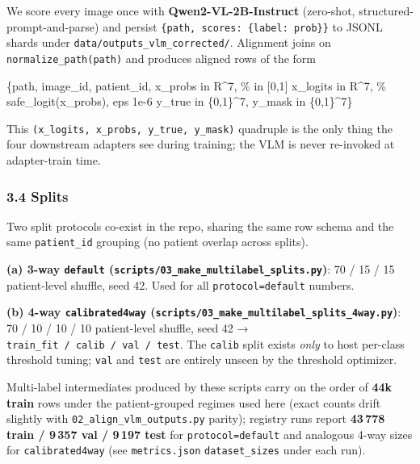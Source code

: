 \documentclass[
  11pt,
]{article}
\newenvironment{Shaded}{}{}
\newcommand{\NormalTok}[1]{#1}
\begin{document}
We score every image once with \textbf{Qwen2-VL-2B-Instruct} (zero-shot,
structured-prompt-and-parse) and persist
\texttt{\{path,\ scores:\ \{label:\ prob\}\}} to JSONL shards under
\texttt{data/outputs\_vlm\_corrected/}. Alignment joins on
\texttt{normalize\_path(path)} and produces aligned rows of the form

\begin{Shaded}
\begin{Highlighting}[]
\NormalTok{\{path, image\_id, patient\_id,}
\NormalTok{ x\_probs   in R\^{}7,    \% in [0,1]}
\NormalTok{ x\_logits  in R\^{}7,    \% safe\_logit(x\_probs), eps 1e{-}6}
\NormalTok{ y\_true    in \{0,1\}\^{}7,}
\NormalTok{ y\_mask    in \{0,1\}\^{}7\}}
\end{Highlighting}
\end{Shaded}

This \texttt{(x\_logits,\ x\_probs,\ y\_true,\ y\_mask)} quadruple is
the only thing the four downstream adapters see during training; the VLM
is never re-invoked at adapter-train time.

\subsubsection{3.4 Splits}\label{splits}

Two split protocols co-exist in the repo, sharing the same row schema
and the same \texttt{patient\_id} grouping (no patient overlap across
splits).

\textbf{(a) 3-way \texttt{default}
(\texttt{scripts/03\_make\_multilabel\_splits.py})}: 70 / 15 / 15
patient-level shuffle, seed 42. Used for all \texttt{protocol=default}
numbers.

\textbf{(b) 4-way \texttt{calibrated4way}
(\texttt{scripts/03\_make\_multilabel\_splits\_4way.py})}: 70 / 10 / 10
/ 10 patient-level shuffle, seed 42 →
\texttt{train\_fit\ /\ calib\ /\ val\ /\ test}. The \texttt{calib} split
exists \emph{only} to host per-class threshold tuning; \texttt{val} and
\texttt{test} are entirely unseen by the threshold optimizer.

Multi-label intermediates produced by these scripts carry on the order
of \textbf{44k train} rows under the patient-grouped regimes used here
(exact counts drift slightly with \texttt{02\_align\_vlm\_outputs.py}
parity); registry runs report \textbf{43\,778 train / 9\,357 val /
9\,197 test} for \texttt{protocol=default} and analogous 4-way sizes for
\texttt{calibrated4way} (see \texttt{metrics.json}
\texttt{dataset\_sizes} under each run).
\end{document}
